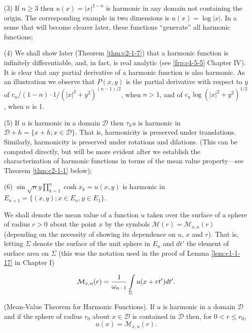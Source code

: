 (3) If $n \geq 3$ then $u(x) = |x|^{2-n}$ is harmonic in any domain not containing the origin. The corresponding example in two dimensions is $u(x) = \log |x|$. In a sense that will become clearer later, these functions ``generate'' all harmonic functions;

(4) We shall show later (Theorem \ref{thm:c2-1-7}) that a harmonic function is infinitely differentiable, and, in fact, is real analytic (see \eqref{frp:c4-5-5} Chapter IV). It is clear that any partial derivative of a harmonic function is also harmonic. As an illustration we observe that $P(x, y)$ is the partial derivative with respect to $y$ of $c_n/(1 - n) \cdot 1/(|x|^2 + y^2)^{(n-1)/2}$, when $n > 1$, and of $c_n \log(|x|^2 + y^2)^{1/2}$, when $n$ is 1.

(5) If $u$ is harmonic in a domain $\mathcal{D}$ then $\tau_h u$ is harmonic in $\mathcal{D} + h = \{x + h; x \in \mathcal{D}\}$. That is, harmonicity is preserved under translations. Similarly, harmonicity is preserved under rotations and dilations. (This can be computed directly, but will be more evident after we establish the characterization of harmonic functions in terms of the mean value property---see Theorem \ref{thm:c2-1-1} below);

(6) $\sin \sqrt{n} y \prod_{k=1}^{n} \cosh x_k = u(x, y)$ is harmonic in $E_{n+1} = \{(x, y); x \in E_n, y \in E_1\}$.

We shall denote the mean value of a function $u$ taken over the surface of a sphere of radius $r > 0$ about the point $x$ by the symbols $\mathcal{M}(r) = \mathcal{M}_{x,u}(r)$ (depending on the necessity of showing its dependence on $u$, $x$ and $r$). That is, letting $\Sigma$ denote the surface of the unit sphere in $E_n$ and $dt'$ the element of surface area on $\Sigma$ (this was the notation used in the proof of Lemma \ref{lem:c1-1-17} in Chapter I)

\[
\mathcal{M}_{x,u}(r)=\frac{1}{\omega_{n-1}}\intop_{\Sigma}u(x+r t^{\prime}) d t^{\prime}.
\]

\begin{theorem}
\label{thm:c2-1-1}
(Mean-Value Theorem for Harmonic Functions). If $u$ is harmonic in a domain $\mathcal{D}$ and if the sphere of radius $r_0$ about $x\in\mathcal{D}$ is contained in $\mathcal{D}$ then, for $0<r\leq r_0$,
\[
u(x)=\mathcal{M}_{x,u}(r).
\]

\end{theorem}

